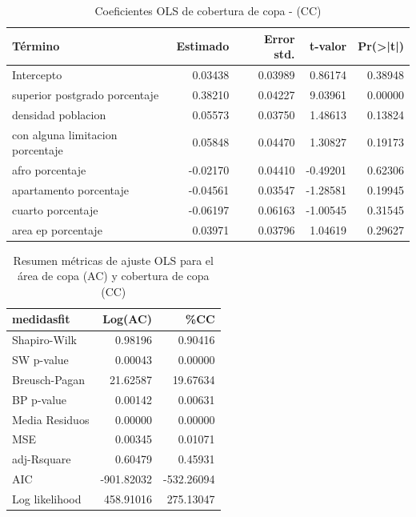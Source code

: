 \documentclass[12pt,a4paper,openany]{book}
\theoremstyle{definition}
\theoremstyle{definition}
\theoremstyle{definition}
\theoremstyle{remark}
\begin{document}
\begin{table}[t]

\caption{\label{tab:coef-lm-cobertura}Coeficientes OLS de cobertura de copa - (CC)}
\centering
\begin{tabular}{lrrrr}
\toprule
Término & Estimado & Error std. & t-valor & Pr(>|t|)\\
\midrule
Intercepto & 0.03438 & 0.03989 & 0.86174 & 0.38948\\
superior postgrado porcentaje & 0.38210 & 0.04227 & 9.03961 & 0.00000\\
densidad poblacion & 0.05573 & 0.03750 & 1.48613 & 0.13824\\
con alguna limitacion porcentaje & 0.05848 & 0.04470 & 1.30827 & 0.19173\\
afro porcentaje & -0.02170 & 0.04410 & -0.49201 & 0.62306\\
\addlinespace
apartamento porcentaje & -0.04561 & 0.03547 & -1.28581 & 0.19945\\
cuarto porcentaje & -0.06197 & 0.06163 & -1.00545 & 0.31545\\
area ep porcentaje & 0.03971 & 0.03796 & 1.04619 & 0.29627\\
\bottomrule
\end{tabular}
\end{table}

\begin{table}[t]

\caption{\label{tab:ajuste-lmcopa-pob-predios}Resumen métricas de ajuste OLS para el área de copa (AC) y cobertura de copa (CC) }
\centering
\begin{tabular}{lrr}
\toprule
medidasfit & Log(AC) & \%CC\\
\midrule
Shapiro-Wilk & 0.98196 & 0.90416\\
SW p-value & 0.00043 & 0.00000\\
Breusch-Pagan & 21.62587 & 19.67634\\
BP p-value & 0.00142 & 0.00631\\
Media Residuos & 0.00000 & 0.00000\\
\addlinespace
MSE & 0.00345 & 0.01071\\
adj-Rsquare & 0.60479 & 0.45931\\
AIC & -901.82032 & -532.26094\\
Log likelihood & 458.91016 & 275.13047\\
\bottomrule
\end{tabular}
\end{table}
\end{document}

